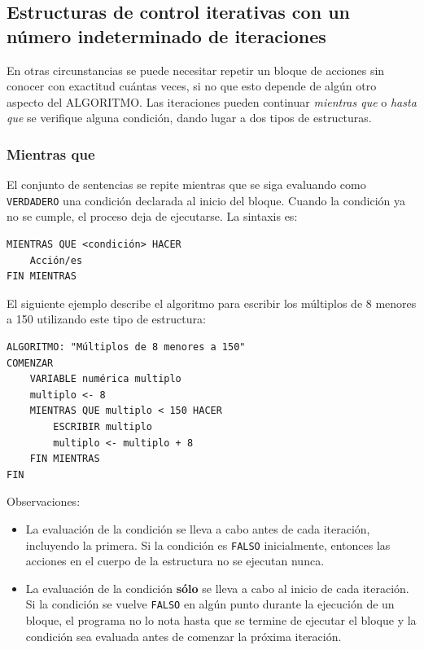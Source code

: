 \documentclass[]{book}
\providecommand{\tightlist}{%
  \setlength{\itemsep}{0pt}\setlength{\parskip}{0pt}}
\begin{document}
\subsection{Estructuras de control iterativas con un número
indeterminado de
iteraciones}\label{estructuras-de-control-iterativas-con-un-numero-indeterminado-de-iteraciones}

En otras circunstancias se puede necesitar repetir un bloque de acciones
sin conocer con exactitud cuántas veces, si no que esto depende de algún
otro aspecto del ALGORITMO. Las iteraciones pueden continuar
\emph{mientras que} o \emph{hasta que} se verifique alguna condición,
dando lugar a dos tipos de estructuras.

\subsubsection{Mientras que}\label{mientras-que}

El conjunto de sentencias se repite mientras que se siga evaluando como
\texttt{VERDADERO} una condición declarada al inicio del bloque. Cuando
la condición ya no se cumple, el proceso deja de ejecutarse. La sintaxis
es:

\begin{verbatim}
MIENTRAS QUE <condición> HACER
    Acción/es
FIN MIENTRAS
\end{verbatim}

El siguiente ejemplo describe el algoritmo para escribir los múltiplos
de 8 menores a 150 utilizando este tipo de estructura:

\begin{verbatim}
ALGORITMO: "Múltiplos de 8 menores a 150"
COMENZAR
    VARIABLE numérica multiplo
    multiplo <- 8
    MIENTRAS QUE multiplo < 150 HACER
        ESCRIBIR multiplo
        multiplo <- multiplo + 8
    FIN MIENTRAS
FIN
\end{verbatim}

Observaciones:

\begin{itemize}
\tightlist
\item
  La evaluación de la condición se lleva a cabo antes de cada iteración,
  incluyendo la primera. Si la condición es \texttt{FALSO} inicialmente,
  entonces las acciones en el cuerpo de la estructura no se ejecutan
  nunca.
\item
  La evaluación de la condición \textbf{sólo} se lleva a cabo al inicio
  de cada iteración. Si la condición se vuelve \texttt{FALSO} en algún
  punto durante la ejecución de un bloque, el programa no lo nota hasta
  que se termine de ejecutar el bloque y la condición sea evaluada antes
  de comenzar la próxima iteración.
\end{itemize}
\end{document}

